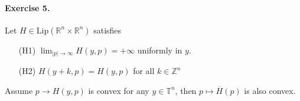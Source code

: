 \documentclass[12pt, oneside]{amsart}  	%
\begin{document}
\vspace*{0.2cm}




\paragraph{\textbf{Exercise 5}.} Let $H\in \text{Lip}(\mathbb{R}^n\times \mathbb{R}^n)$ satisfies \vspace*{0.15cm}
\begin{itemize}
\item[(H1)] $\displaystyle \lim_{|p|\longrightarrow\infty} H(y,p) = +\infty$ uniformly in $y$.\vspace*{0.15cm}
\item[(H2)] $H(y+k,p) = H(y,p)$ for all $k\in \mathbb{Z}^n$\vspace*{0.15cm}
\end{itemize}
Assume $p\longrightarrow H(y,p)$ is convex for any $y\in \mathbb{T}^n$, then $p\longmapsto\overline{H}(p)$ is also convex.

\vspace*{0.2cm}
\end{document}
